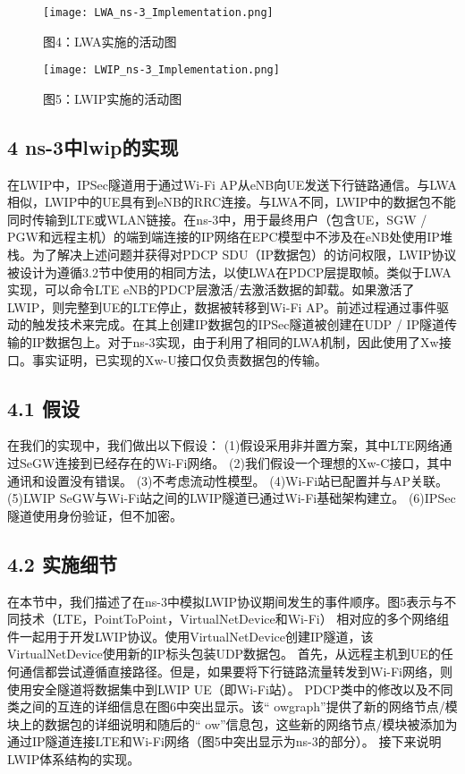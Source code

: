 \begin{figure}[htb]
  \centering
  \texttt{[image: LWA\_ns-3\_Implementation.png]}
  \caption*{图4：LWA实施的活动图}
\end{figure}


\begin{figure}[htb]
  \centering
  \texttt{[image: LWIP\_ns-3\_Implementation.png]}
  \caption{图5：LWIP实施的活动图}
\end{figure}

\newpage
\subsection*{4 ns-3中lwip的实现}
在LWIP中，IPSec隧道用于通过Wi-Fi AP从eNB向UE发送下行链路通信。与LWA相似，LWIP中的UE具有到eNB的RRC连接。与LWA不同，LWIP中的数据包不能同时传输到LTE或WLAN链接。在ns-3中，用于最终用户（包含UE，SGW / PGW和远程主机）的端到端连接的IP网络在EPC模型中不涉及在eNB处使用IP堆栈。为了解决上述问题并获得对PDCP SDU（IP数据包）的访问权限，LWIP协议被设计为遵循3.2节中使用的相同方法，以使LWA在PDCP层提取帧。类似于LWA实现，可以命令LTE eNB的PDCP层激活/去激活数据的卸载。如果激活了LWIP，则完整到UE的LTE停止，数据被转移到Wi-Fi AP。前述过程通过事件驱动的触发技术来完成。在其上创建IP数据包的IPSec隧道被创建在UDP / IP隧道传输的IP数据包上。对于ns-3实现，由于利用了相同的LWA机制，因此使用了Xw接口。事实证明，已实现的Xw-U接口仅负责数据包的传输。


\subsection*{4.1 假设}
在我们的实现中，我们做出以下假设：
(1)假设采用非并置方案，其中LTE网络通过SeGW连接到已经存在的Wi-Fi网络。
(2)我们假设一个理想的Xw-C接口，其中通讯和设置没有错误。
(3)不考虑流动性模型。
(4)Wi-Fi站已配置并与AP关联。
(5)LWIP SeGW与Wi-Fi站之间的LWIP隧道已通过Wi-Fi基础架构建立。
(6)IPSec隧道使用身份验证，但不加密。

\subsection*{4.2 实施细节}
在本节中，我们描述了在ns-3中模拟LWIP协议期间发生的事件顺序。图5表示与不同技术（LTE，PointToPoint，VirtualNetDevice和Wi-Fi）
相对应的多个网络组件一起用于开发LWIP协议。使用VirtualNetDevice创建IP隧道，该VirtualNetDevice使用新的IP标头包装UDP数据包。
首先，从远程主机到UE的任何通信都尝试遵循直接路径。但是，如果要将下行链路流量转发到Wi-Fi网络，则使用安全隧道将数据集中到LWIP UE（即Wi-Fi站）。
PDCP类中的修改以及不同类之间的互连的详细信息在图6中突出显示。该“ owgraph”提供了新的网络节点/模块上的数据包的详细说明和随后的“ ow”信息包，这些新的网络节点/模块被添加为通过IP隧道连接LTE和Wi-Fi网络（图5中突出显示为ns-3的部分）。
接下来说明LWIP体系结构的实现。

